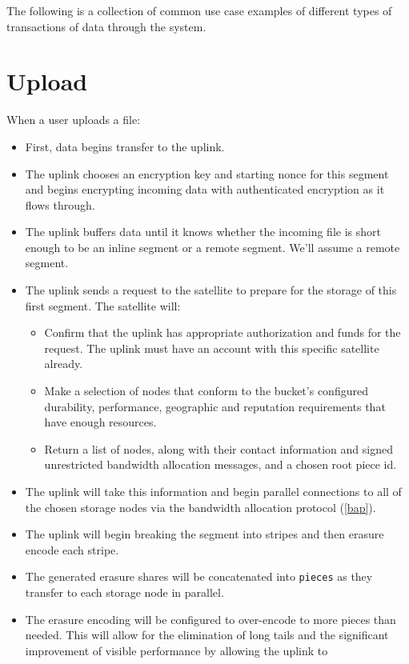 \documentclass[11pt,fleqn,openany]{book}
\newcommand{\x}[1]{{\tt #1}} \newcommand{\code}[1]{{\em #1}}
\begin{document}
The following is a collection of common use case examples of different types of
transactions of data through the system.

\section{Upload}

When a user uploads a file:

\begin{itemize}
\item First, data begins transfer to the uplink.
\item The uplink chooses an encryption key and starting nonce for
  this segment and begins encrypting incoming data with authenticated
  encryption as it flows through.
\item The uplink buffers data until it knows whether the incoming file is
short enough to be an inline segment or a remote segment. We'll assume a remote
segment.
\item The uplink sends a request to the satellite to prepare for the storage
of this first segment. The satellite will:
  \begin{itemize}
  \item Confirm that the uplink has appropriate authorization and funds for
    the request. The uplink must have an account with this
specific satellite already.
  \item Make a selection of nodes that conform to the bucket's configured
    durability, performance, geographic and reputation requirements that have
    enough resources.
  \item Return a list of nodes, along with their contact information and
    signed unrestricted bandwidth allocation messages, and a chosen root piece
    id.
  \end{itemize}
\item The uplink will take this information and begin parallel connections to
  all of the chosen storage nodes via the bandwidth allocation protocol
  (\ref{bap}).
\item The uplink will begin breaking the segment into stripes and then
  erasure encode each stripe.
\item The generated erasure shares will be concatenated into \x{pieces} as they
  transfer to each storage node in parallel.
\item The erasure encoding will be configured to over-encode to more pieces
  than needed. This will allow for the elimination of long tails and the
  significant improvement of visible performance by allowing the uplink to

\end{itemize}
\end{document}
